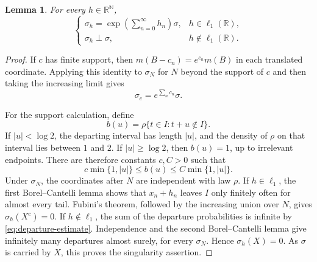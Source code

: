 \documentclass[11pt]{article}
\numberwithin{equation}{section}
\newtheorem{lemma}[theorem]{Lemma}
\theoremstyle{definition}
\newcommand{\N}{\mathbb N}
\newcommand{\R}{\mathbb R}
\begin{document}
\begin{lemma}
\label{lem:restricted-translation}
For every $h\in\R^{\N}$,
\[
 \begin{cases}
 \displaystyle\sigma_h=\exp\!\left(\sum_{n=0}^{\infty}h_n\right)\sigma,
       & h\in\ell_1(\R),\\[4pt]
 \sigma_h\perp\sigma,&h\notin\ell_1(\R).
 \end{cases}
\]
\end{lemma}

\begin{proof}
If $c$ has finite support, then $m(B-c_n)=e^{c_n}m(B)$ in each translated
coordinate. Applying this identity to $\sigma_N$ for $N$ beyond the support
of $c$ and then taking the increasing limit gives
\begin{equation}
 \sigma_c=e^{\sum_n c_n}\sigma.
 \label{eq:finite-shift-modulus}
\end{equation}

For the support calculation, define
\[
 b(u)=\rho\{t\in I:t+u\notin I\}.
\]
If $|u|<\log2$, the departing interval has length $|u|$, and the density
of $\rho$ on that interval lies between $1$ and $2$. If $|u|\geq\log2$,
then $b(u)=1$, up to irrelevant endpoints. There are therefore constants
$c,C>0$ such that
\begin{equation}
 c\min\{1,|u|\}\leq b(u)\leq C\min\{1,|u|\}.
 \label{eq:departure-estimate}
\end{equation}
Under $\sigma_N$, the coordinates after $N$ are independent with law
$\rho$. If $h\in\ell_1$, the first Borel--Cantelli lemma shows that
$x_n+h_n$ leaves $I$ only finitely often for almost every tail. Fubini's
theorem, followed by the increasing union over $N$, gives
$\sigma_h(X^c)=0$. If $h\notin\ell_1$, the sum of the departure
probabilities is infinite by \eqref{eq:departure-estimate}. Independence
and the second Borel--Cantelli lemma give infinitely many departures
almost surely, for every $\sigma_N$. Hence $\sigma_h(X)=0$. As $\sigma$
is carried by $X$, this proves the singularity assertion.


\end{proof}
\end{document}
